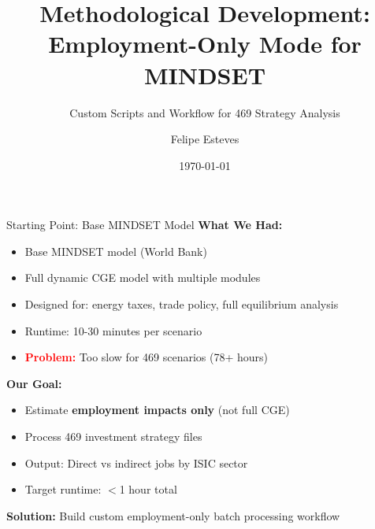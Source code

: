 \documentclass[10pt]{beamer}
\title[MINDSET Employment Methods]{Methodological Development: \\Employment-Only Mode for MINDSET}
\subtitle{Custom Scripts and Workflow for 469 Strategy Analysis}
\author{Felipe Esteves}
\institute{RAND Corporation}
\date{\today}
\begin{document}
\frame{\titlepage}


\begin{frame}{Starting Point: Base MINDSET Model}
\textbf{What We Had:}

\vspace{0.3cm}

\begin{itemize}
    \item Base MINDSET model (World Bank)
    \item Full dynamic CGE model with multiple modules
    \item Designed for: energy taxes, trade policy, full equilibrium analysis
    \item Runtime: 10-30 minutes per scenario
    \item \textcolor{red}{\textbf{Problem:}} Too slow for 469 scenarios (78+ hours)
\end{itemize}

\vspace{0.5cm}

\textbf{Our Goal:}

\vspace{0.3cm}

\begin{itemize}
    \item Estimate \textbf{employment impacts only} (not full CGE)
    \item Process 469 investment strategy files
    \item Output: Direct vs indirect jobs by ISIC sector
    \item Target runtime: $<$1 hour total
\end{itemize}

\vspace{0.5cm}

\textbf{Solution:} Build custom employment-only batch processing workflow
\end{frame}

\end{document}

